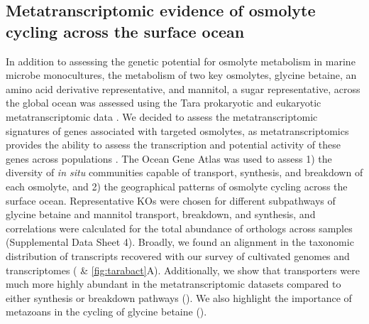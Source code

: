 \documentclass[utf8]{frontiersSCNS} %
\begin{document}
\subsection{Metatranscriptomic evidence of osmolyte cycling across the surface ocean}

In addition to assessing the genetic potential for osmolyte metabolism in marine microbe monocultures, the metabolism of two key osmolytes, glycine betaine, an amino acid derivative representative, and mannitol, a sugar representative, across the global ocean was assessed using the Tara prokaryotic and eukaryotic metatranscriptomic data \citep{Salazar_2019, Carradec2018}. We decided to assess the metatranscriptomic signatures of genes associated with targeted osmolytes, as metatranscriptomics provides the ability to assess the transcription and potential activity of these genes across populations  \citep{Alexander2015a, Alexander2020, hu2018, Salazar_2019}. The Ocean Gene Atlas \citep{Villar_2018} was used to assess 1) the diversity of \emph{in situ} communities capable of transport, synthesis, and breakdown of each osmolyte, and 2) the geographical patterns of osmolyte cycling across the surface ocean. Representative KOs were chosen for different subpathways of glycine betaine and mannitol transport, breakdown, and synthesis, and correlations were calculated for the total abundance of orthologs across samples (Supplemental Data Sheet 4). Broadly, we found an alignment in the taxonomic distribution of transcripts recovered with our survey of cultivated genomes and transcriptomes ( \& \ref{fig:tarabact}A). Additionally, we show that transporters were much more highly abundant in the metatranscriptomic datasets compared to either synthesis or breakdown pathways (). We also highlight the importance of metazoans in the cycling of glycine betaine (). 
\end{document}
